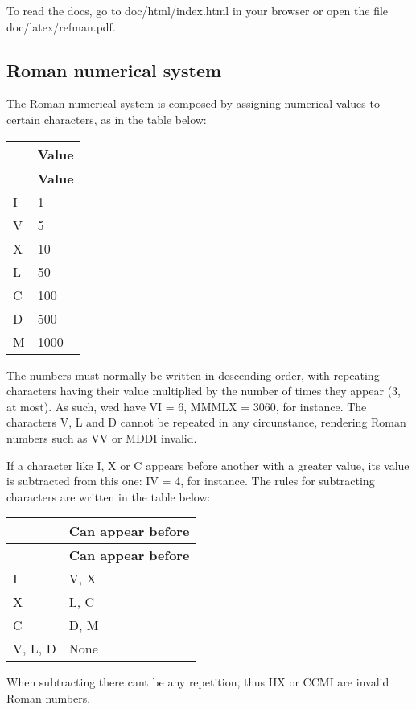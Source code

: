To read the docs, go to {\ttfamily doc/html/index.\+html} in your browser or open the file {\ttfamily doc/latex/refman.\+pdf}.

\subsection*{Roman numerical system }

The Roman numerical system is composed by assigning numerical values to certain characters, as in the table below\+:

\tabulinesep=1mm
\begin{longtabu} spread 0pt [c]{*2{|X[-1]}|}
\hline
{}&{\bf Value  }\\
\endfirsthead
\hline
\endfoot
\hline
{}&{\bf Value  }\\
\endhead
I &1 \\
V &5 \\
X &10 \\
L &50 \\
C &100 \\
D &500 \\
M &1000 \\
\end{longtabu}
The numbers must normally be written in descending order, with repeating characters having their value multiplied by the number of times they appear (3, at most). As such, we\textquotesingle{}d have VI = 6, M\+M\+M\+LX = 3060, for instance. The characters V, L and D cannot be repeated in any circunstance, rendering Roman numbers such as VV or M\+D\+DI invalid.

If a character like I, X or C appears before another with a greater value, its value is subtracted from this one\+: IV = 4, for instance. The rules for subtracting characters are written in the table below\+:

\tabulinesep=1mm
\begin{longtabu} spread 0pt [c]{*2{|X[-1]}|}
\hline
{}&{\bf Can appear before  }\\
\endfirsthead
\hline
\endfoot
\hline
{}&{\bf Can appear before  }\\
\endhead
I &V, X \\
X &L, C \\
C &D, M \\
V, L, D &None \\
\end{longtabu}
When subtracting there can\textquotesingle{}t be any repetition, thus I\+IX or C\+C\+MI are invalid Roman numbers. 